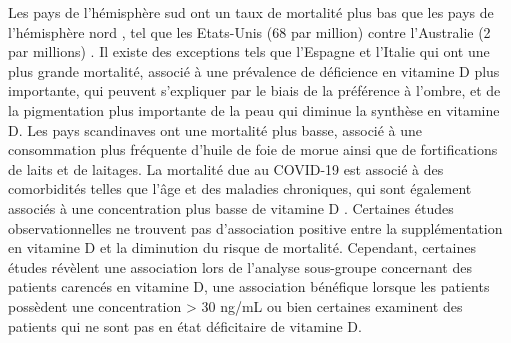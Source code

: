 \documentclass[
  a4paper,
  DIV=11,
  numbers=noendperiod,
  listof=totoc]{scrreprt}
\begin{document}
Les pays de l'hémisphère sud ont un taux de mortalité plus bas que les
pays de l'hémisphère nord \autocite{Contreras-Bolívar.2023}, tel que les
Etats-Unis (68 par million) contre l'Australie (2 par millions)
\autocite{Bishop.2021}. Il existe des exceptions tels que l'Espagne et
l'Italie qui ont une plus grande mortalité, associé à une prévalence de
déficience en vitamine D plus importante, qui peuvent s'expliquer par le
biais de la préférence à l'ombre, et de la pigmentation plus importante
de la peau qui diminue la synthèse en vitamine D. Les pays scandinaves
ont une mortalité plus basse, associé à une consommation plus fréquente
d'huile de foie de morue ainsi que de fortifications de laits et de
laitages. La mortalité due au COVID-19 est associé à des comorbidités
telles que l'âge et des maladies chroniques, qui sont également associés
à une concentration plus basse de vitamine D \autocite{Bishop.2021}.
Certaines études observationnelles ne trouvent pas d'association
positive entre la supplémentation en vitamine D et la diminution du
risque de mortalité. Cependant, certaines études révèlent une
association lors de l'analyse sous-groupe concernant des patients
carencés en vitamine D, une association bénéfique lorsque les patients
possèdent une concentration \textgreater{} 30 ng/mL
\autocite{Oristrell.2022} ou bien certaines examinent des patients qui
ne sont pas en état déficitaire de vitamine D.
\end{document}
